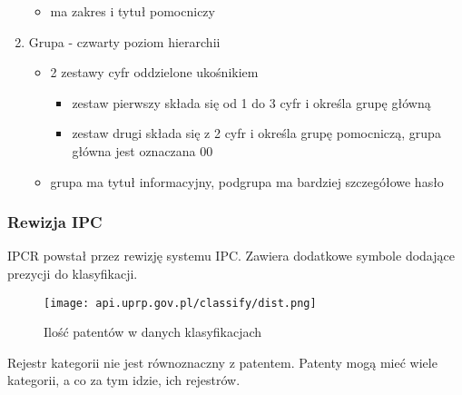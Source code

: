 \begin{enumerate}
\begin{itemize}
        \item ma zakres i tytuł pomocniczy
    \end{itemize}
    \item Grupa - czwarty poziom hierarchii
    \begin{itemize}
        \item 2 zestawy cyfr oddzielone ukośnikiem
        \begin{itemize}
            \item zestaw pierwszy składa się od 1 do 3 cyfr i określa grupę główną
            \item zestaw drugi składa się z 2 cyfr i określa grupę pomocniczą, grupa główna jest oznaczana 00
        \end{itemize}
        \item grupa ma tytuł informacyjny, podgrupa ma bardziej szczegółowe hasło
    \end{itemize}
\end{enumerate}



\subsubsection{Rewizja \ac{IPC}}

\ac{IPCR} powstał przez rewizję systemu \ac{IPC}. Zawiera dodatkowe
symbole dodające prezycji do klasyfikacji.

\begin{figure}[H]\centering
\texttt{[image: api.uprp.gov.pl/classify/dist.png]}
\caption{Ilość patentów w danych klasyfikacjach}
\end{figure}


\begin{uwaga}
Rejestr kategorii nie jest równoznaczny z patentem. Patenty
mogą mieć wiele kategorii, a co za tym idzie, ich rejestrów.
\end{uwaga}